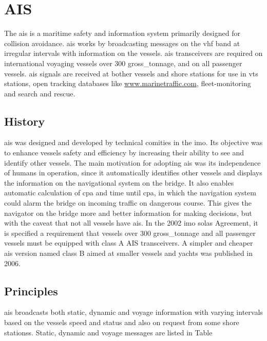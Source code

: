 \section{AIS}
The \acrfull{ais} is a maritime safety and information system primarily designed for collision avoidance. \gls{ais} works by broadcasting messages on the \gls{vhf} band at irregular intervals with information on the vessels. \gls{ais} transceivers are required on international voyaging vessels over 300 \gls{gross_tonnage}, and on all passenger vessels. \gls{ais} signals are received at bother vessels and shore stations for use in \gls{vts} stations, open tracking databases like \url{www.marinetraffic.com}, fleet-monitoring and search and rescue.

\subsection{History}
\gls{ais} was designed and developed by technical comities in the \gls{imo}. Its objective was to enhance vessels safety and efficiency by increasing their ability to see and identify other vessels. The main motivation for adopting \gls{ais} was its independence of humans in operation, since it automatically identifies other vessels and displays the information on the navigational system on the bridge. It also enables automatic calculation of \gls{cpa} and time until \gls{cpa}, in which the navigation system could alarm the bridge on incoming traffic on dangerous course. This gives the navigator on the bridge more and better information for making decisions, but with the caveat that not all vessels have \gls{ais}. In the 2002 \gls{imo} \gls{solas} Agreement, it is specified a requirement that vessels over 300 \gls{gross_tonnage} and all passenger vessels must be equipped with class A AIS transceivers. A simpler and cheaper \gls{ais} version named class B aimed at smaller vessels and yachts was published in 2006.

\subsection{Principles}
\gls{ais} broadcasts both static, dynamic and voyage information with varying intervals based on the vessels speed and status and also on request from some shore stationss. Static, dynamic and voyage messages are listed in Table~\

